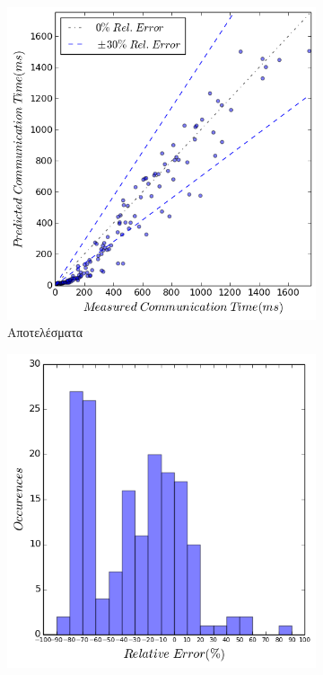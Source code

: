 \begin{figure}
    \centering
    \captionsetup{justification=centering,margin=0cm,font=footnotesize}
    \begin{subfigure}[b]{0.47\textwidth}
        \includegraphics[width=\textwidth]{./images/NB_NUMA/jacobi_res_nfe.png}
        \caption{Αποτελέσματα}
    \end{subfigure}
    \quad %
    \begin{subfigure}[b]{0.47\textwidth}
        \includegraphics[width=\textwidth]{./images/NB_NUMA/jacobi_err_dist_nfe.png}

\end{subfigure}
\end{figure}
